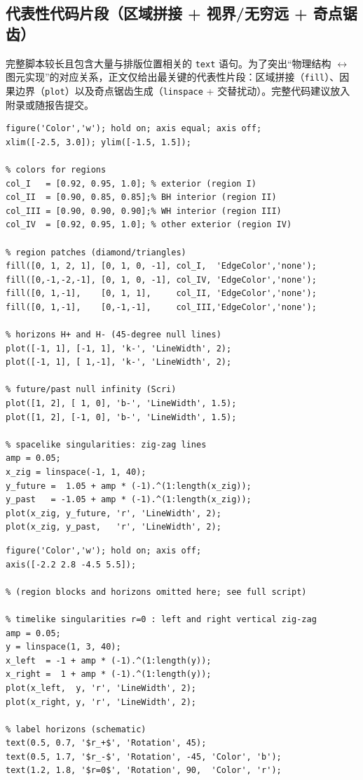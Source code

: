 \documentclass[a4paper,12pt]{article}
\begin{document}
\subsection{代表性代码片段（区域拼接 + 视界/无穷远 + 奇点锯齿）}

完整脚本较长且包含大量与排版位置相关的 \texttt{text} 语句。为了突出“物理结构 $\leftrightarrow$ 图元实现”的对应关系，正文仅给出最关键的代表性片段：区域拼接（\texttt{fill}）、因果边界（\texttt{plot}）以及奇点锯齿生成（\texttt{linspace} + 交替扰动）。完整代码建议放入附录或随报告提交。

\begin{lstlisting}[caption={Schwarzschild：区域拼接、视界与奇点（代表性实现）}, label={lst:penrose_schw_core}]
% --- Schwarzschild Penrose: core drawing ---
figure('Color','w'); hold on; axis equal; axis off;
xlim([-2.5, 3.0]); ylim([-1.5, 1.5]);

% colors for regions
col_I   = [0.92, 0.95, 1.0]; % exterior (region I)
col_II  = [0.90, 0.85, 0.85];% BH interior (region II)
col_III = [0.90, 0.90, 0.90];% WH interior (region III)
col_IV  = [0.92, 0.95, 1.0]; % other exterior (region IV)

% region patches (diamond/triangles)
fill([0, 1, 2, 1], [0, 1, 0, -1], col_I,  'EdgeColor','none');
fill([0,-1,-2,-1], [0, 1, 0, -1], col_IV, 'EdgeColor','none');
fill([0, 1,-1],    [0, 1, 1],     col_II, 'EdgeColor','none');
fill([0, 1,-1],    [0,-1,-1],     col_III,'EdgeColor','none');

% horizons H+ and H- (45-degree null lines)
plot([-1, 1], [-1, 1], 'k-', 'LineWidth', 2);
plot([-1, 1], [ 1,-1], 'k-', 'LineWidth', 2);

% future/past null infinity (Scri)
plot([1, 2], [ 1, 0], 'b-', 'LineWidth', 1.5);
plot([1, 2], [-1, 0], 'b-', 'LineWidth', 1.5);

% spacelike singularities: zig-zag lines
amp = 0.05;
x_zig = linspace(-1, 1, 40);
y_future =  1.05 + amp * (-1).^(1:length(x_zig));
y_past   = -1.05 + amp * (-1).^(1:length(x_zig));
plot(x_zig, y_future, 'r', 'LineWidth', 2);
plot(x_zig, y_past,   'r', 'LineWidth', 2);
\end{lstlisting}

\begin{lstlisting}[caption={RN：竖直锯齿奇点与视界标注（代表性实现）}, label={lst:penrose_rn_core}]
% --- RN Penrose: timelike singularities as vertical zig-zag ---
figure('Color','w'); hold on; axis off;
axis([-2.2 2.8 -4.5 5.5]);

% (region blocks and horizons omitted here; see full script)

% timelike singularities r=0 : left and right vertical zig-zag
amp = 0.05;
y = linspace(1, 3, 40);
x_left  = -1 + amp * (-1).^(1:length(y));
x_right =  1 + amp * (-1).^(1:length(y));
plot(x_left,  y, 'r', 'LineWidth', 2);
plot(x_right, y, 'r', 'LineWidth', 2);

% label horizons (schematic)
text(0.5, 0.7, '$r_+$', 'Rotation', 45);
text(0.5, 1.7, '$r_-$', 'Rotation', -45, 'Color', 'b');
text(1.2, 1.8, '$r=0$', 'Rotation', 90,  'Color', 'r');
\end{lstlisting}
\end{document}
